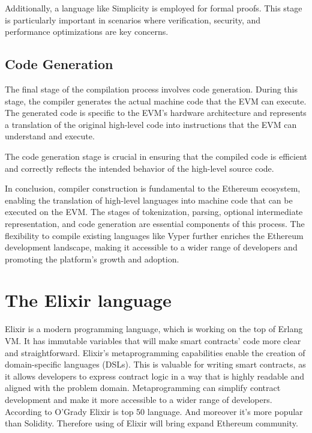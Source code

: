 Additionally, a language like Simplicity is employed for formal proofs. This stage is particularly important in scenarios where verification, security, and performance optimizations are key concerns.

\subsection{Code Generation}

The final stage of the compilation process involves code generation. During this stage, the compiler generates the actual machine code that the EVM can execute. The generated code is specific to the EVM's hardware architecture and represents a translation of the original high-level code into instructions that the EVM can understand and execute.

The code generation stage is crucial in ensuring that the compiled code is efficient and correctly reflects the intended behavior of the high-level source code.


In conclusion, compiler construction is fundamental to the Ethereum ecosystem, enabling the translation of high-level languages into machine code that can be executed on the EVM. The stages of tokenization, parsing, optional intermediate representation, and code generation are essential components of this process. The flexibility to compile existing languages like Vyper further enriches the Ethereum development landscape, making it accessible to a wider range of developers and promoting the platform's growth and adoption.

\section{The Elixir language}

Elixir is a modern programming language, which is working on the top of Erlang VM. It has immutable variables that will make smart contracts' code more clear and straightforward. Elixir's metaprogramming capabilities enable the creation of domain-specific languages (DSLs). This is valuable for writing smart contracts, as it allows developers to express contract logic in a way that is highly readable and aligned with the problem domain. Metaprogramming can simplify contract development and make it more accessible to a wider range of developers. According to O'Grady \cite{RedMonk} Elixir is top 50 language. And moreover it's more popular than Solidity. Therefore using of Elixir will bring expand Ethereum community.

